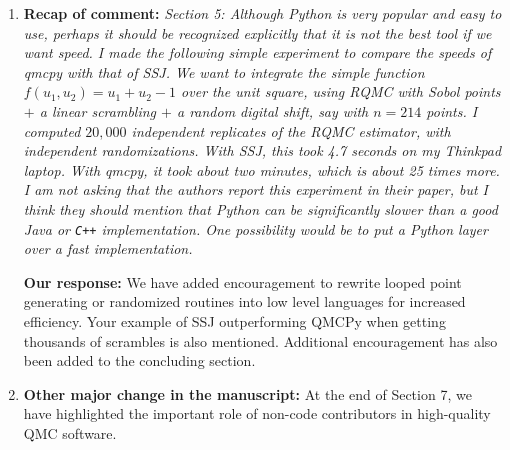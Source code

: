 \documentclass{article}[12pt]
\begin{document}
\begin{enumerate}
    \item \textbf{Recap of comment:} \textit{Section 5: Although Python is very popular and easy to use, perhaps it should be
recognized explicitly that it is not the best tool if we want speed. I made the following
simple experiment to compare the speeds of qmcpy with that of SSJ. We want to
integrate the simple function $f(u_1, u_2) = u_1 + u_2 - 1$ over the unit square, using
RQMC with Sobol points $+$ a linear scrambling $+$ a random digital shift, say with
$n = 214$ points. I computed $20,000$ independent replicates of the RQMC estimator,
with independent randomizations. With SSJ, this took 4.7 seconds on my Thinkpad
laptop. With qmcpy, it took about two minutes, which is about 25 times more. I
am not asking that the authors report this experiment in their paper, but I think
they should mention that Python can be significantly slower than a good Java or
\texttt{C++} implementation. One possibility would be to put a Python layer over a fast implementation.
}
    
    	    \textbf{Our response:} We have added encouragement to rewrite looped point generating or randomized routines into low level languages for increased efficiency. Your example of SSJ outperforming QMCPy when getting thousands of scrambles is also mentioned. Additional encouragement has also been added to the concluding section. 
    
    \item  \textbf{Other major change in the manuscript:}
    At the end of Section 7, we have highlighted the important role of non-code contributors in high-quality QMC software.
    
\end{enumerate}
\end{document}
